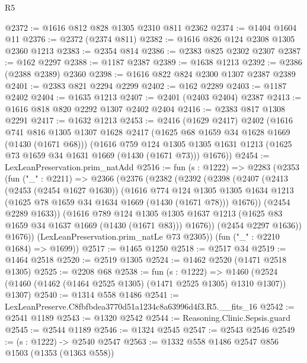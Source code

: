 \begin{lexlean}{R5}
\begin{coremodule}
@2372 := @1616 @812 @828 @1305 @2310 @811 @2362
@2374 := @1404 @1604 @11
@2376 := @2372 (@2374 @811)
@2382 := @1616 @826 @124 @2308 @1305 @2360 @1213
@2383 := @2354 @814
@2386 := @2383 @825 @2302 @2307
@2387 := @162 @2297
@2388 := @1187 @2387
@2389 := @1638 @1213
@2392 := @2386 (@2388 @2389) @2360
@2398 := @1616 @822 @824 @2300 @1307 @2387 @2389
@2401 := @2383 @821 @2294 @2299
@2402 := @162 @2289
@2403 := @1187 @2402
@2404 := @1635 @1213
@2407 := @2401 (@2403 @2404) @2387
@2413 := @1616 @818 @820 @2292 @1307 @2402 @2404
@2416 := @2383 @817 @1308 @2291
@2417 := @1632 @1213
@2453 := @2416
    (@1629 @2417)
    @2402
    (@1616
      @741
      @816
      @1305
      @1307
      @1628
      @2417
      (@1625 @68 @1659 @34 @1628 @1669 (@1430 (@1671 @68)))
      (@1616
        @759
        @124
        @1305
        @1305
        @1631
        @1213
        (@1625 @73 @1659 @34 @1631 @1669 (@1430 (@1671 @73)))
        @1676))
@2454 := LexLeanPreservation.prim_natAdd
@2516 := fun (s : @1222) =>
  @2283
    (@2353
      (fun ("_" : @2211) =>
      @2366
        (@2376
          (@2382
            (@2392
              (@2398
                (@2407
                  (@2413
                    (@2453 (@2454 @1627 @1630))
                    (@1616
                      @774
                      @124
                      @1305
                      @1305
                      @1634
                      @1213
                      (@1625 @78 @1659 @34 @1634 @1669 (@1430 (@1671 @78)))
                      @1676))
                  (@2454 @2289 @1633))
                (@1616
                  @789
                  @124
                  @1305
                  @1305
                  @1637
                  @1213
                  (@1625 @83 @1659 @34 @1637 @1669 (@1430 (@1671 @83)))
                  @1676))
              (@2454 @2297 @1636))
            @1676))
        (LexLeanPreservation.prim_natLe @73 @2305))
      (fun ("_" : @2210 @1684) => @1699))
@2517 := @1465 @1250
@2518 := @2517 @34
@2519 := @1464 @2518
@2520 := @2519 @1305
@2524 := @1462 @2520 (@1471 @2518 @1305)
@2525 := @2208 @68
@2538 := fun (s : @1222) =>
  @1460 (@2524 (@1460 (@1462 (@1464 @2525 @1305) (@1471 @2525 @1305) @1310 @1307)) @1307)
@2540 := @1314 @558 @1486
@2541 := LexLeanPreserve.C8fbfbdea3770d51a1234c8a63996d4f3.R5.__fits_16
@2542 := @2541 @1189
@2543 := @1320 @2542
@2544 := Reasoning.Clinic.Sepsis.guard
@2545 := @2544 @1189
@2546 := @1324 @2545
@2547 := @2543 @2546
@2549 := (s : @1222) -> @2540 @2547
@2563 := @1332
    @558
    @1486
    @2547
    @856
    @1503
    (@1353 (@1363 @558))

\end{coremodule}
\end{lexlean}
